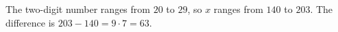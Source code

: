The two-digit number ranges from $20$ to $29$, so $x$ ranges from $140$ to $203$. The difference is $203-140=9\cdot7=\boxed{63}$.
